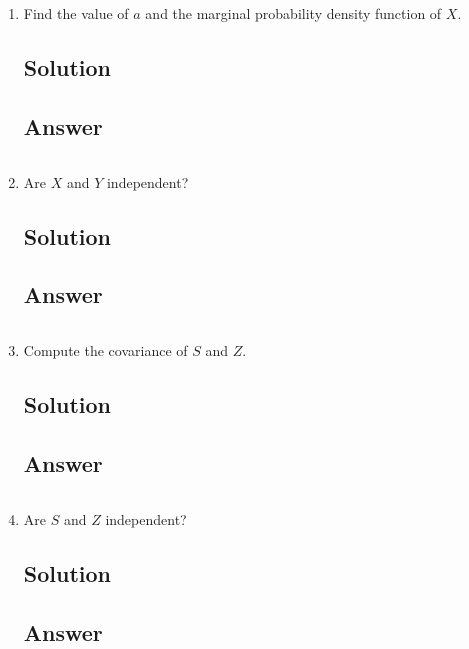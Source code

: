 \documentclass[12pt]{article}
\begin{document}
	\begin{enumerate}[start=1,label={\bfseries Part \arabic*:},leftmargin=0in]
		\bigskip\item Find the value of $a$ and the marginal probability density function of $X$.
		
		\subsection*{Solution}
		
		\subsection*{Answer}
		
			\[\boxed{}\]
		
		\bigskip\item Are $X$ and $Y$ independent?
		
		\subsection*{Solution}
		
		\subsection*{Answer}
		
			\[\boxed{}\]
			
		\bigskip\item Compute the covariance of $S$ and $Z$.
		
		\subsection*{Solution}
		
		\subsection*{Answer}
		
			\[\boxed{}\]
		
		\bigskip\item Are $S$ and $Z$ independent?
		
		\subsection*{Solution}
		
		\subsection*{Answer}
		
		\[\boxed{}\]
	\end{enumerate}
	
\end{document}
